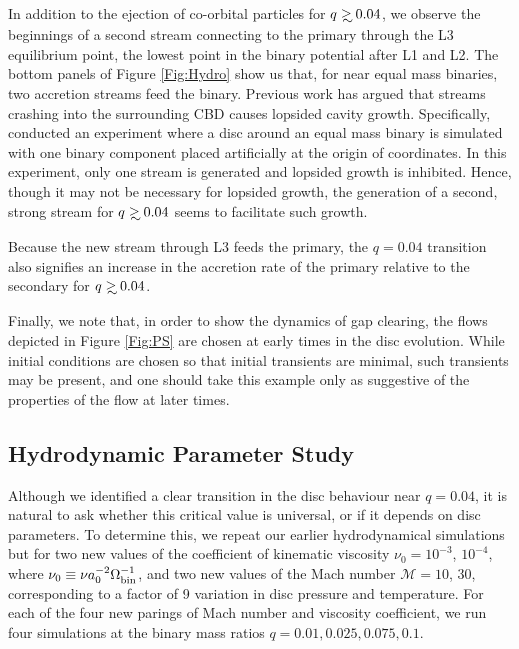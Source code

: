 \documentclass[usenatbib]{mnras}
\newcommand\gsim{\mathrel{\rlap{\lower4pt\hbox{\hskip1pt$\sim$}}
        \raise1pt\hbox{$>$}}}
\def\Mach{\mathcal{M}}
\def\bin{\rm{bin}}
\begin{document}
In addition to the ejection of co-orbital particles for $q\gsim 0.04$,
we observe the beginnings of a second stream connecting to the primary
through the L3 equilibrium point, the lowest point in the
binary potential after L1 and L2. The bottom panels of Figure
\ref{Fig:Hydro} show us that, for near equal mass binaries, two accretion streams feed the binary. 
Previous work \citep{ShiKrolik:2012:ApJ, DHM:2013:MNRAS} has argued 
that streams crashing into the surrounding CBD causes lopsided cavity growth. Specifically, \citep{DHM:2013:MNRAS} conducted an experiment where a disc around an equal mass binary is simulated with one binary component placed artificially at the origin of coordinates. In this experiment, only one stream is generated and lopsided growth is inhibited. Hence, though it may not be necessary for lopsided growth, the generation of a second, strong stream for $q \gsim 0.04$ seems to facilitate such growth.

Because the new stream through L3 feeds the primary,
the $q=0.04$ transition also signifies an increase in the accretion
rate of the primary relative to the secondary for $q\gsim0.04$.

Finally, we note that, in order to show the dynamics of gap clearing, 
the flows depicted in Figure \ref{Fig:PS} are chosen at early times in the disc 
evolution. While initial conditions are chosen so that initial transients 
are minimal, such transients may be present, and one should take 
this example only as suggestive of the properties of the flow at later times.

\subsection{Hydrodynamic Parameter Study}
\label{ParamStudy}
Although we identified a clear transition in the disc behaviour near
$q=0.04$, it is natural to ask whether this critical value is universal,
or if it depends on disc parameters. To determine this, we repeat our earlier
hydrodynamical simulations but for two new values of the coefficient
of kinematic viscosity $\nu_0 = 10^{-3} $, $10^{-4}$, where $\nu_0
\equiv \nu a^{-2}_0 \Omega^{-1}_{\bin}$, and two new values of the
Mach number $\Mach = 10$, $30$, corresponding to a factor of 9
variation in disc pressure and temperature. For each of the four new parings of Mach
number and viscosity coefficient, we run four simulations at the
binary mass ratios $q=0.01, 0.025, 0.075, 0.1$.
\end{document}
